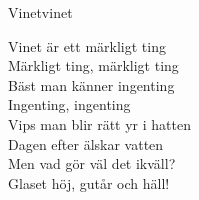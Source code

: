 \begin{song}{Vinet}{vinet}
\begin{vers}
Vinet är ett märkligt ting\\
Märkligt ting, märkligt ting\\
Bäst man känner ingenting\\
Ingenting, ingenting\\
Vips man blir rätt yr i hatten\\
Dagen efter älskar vatten\\
Men vad gör väl det ikväll?\\
Glaset höj, gutår och häll!\\
\end{vers}
\end{song}
